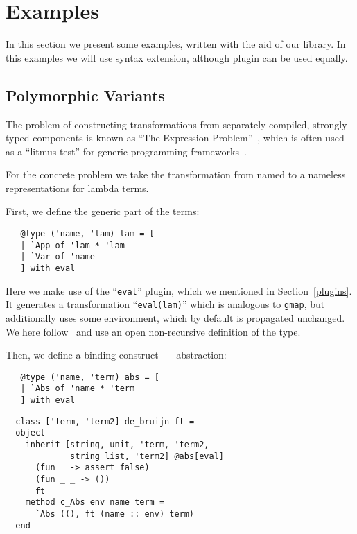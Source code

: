 \section{Examples}

In this section we present some examples, written with the aid of our library. In this examples we will use  syntax extension,
although  plugin can be used equally.


\subsection{Polymorphic Variants}


The problem of
constructing transformations from separately compiled, strongly typed components is known as ``The Expression Problem''~\cite{ExpressionProblem}, which
is often used as a ``litmus test'' for generic programming frameworks~\cite{ObjectAlgebras,ALaCarte}.

For the concrete problem we take the transformation from named to a nameless representations for lambda terms.

First, we define the generic part of the terms:

\begin{lstlisting}
   @type ('name, 'lam) lam = [
   | `App of 'lam * 'lam
   | `Var of 'name
   ] with eval
\end{lstlisting}

Here we make use of the ``\lstinline{eval}'' plugin, which we mentioned in Section~\ref{plugins}. It generates a transformation ``\lstinline{eval(lam)}'' which is analogous
to \lstinline{gmap}, but additionally uses some environment, which by default is propagated unchanged. We here follow~\cite{PolyVarReuse} and use an open non-recursive definition
of the type.

Then, we define a binding construct~--- abstraction:

\begin{lstlisting}
   @type ('name, 'term) abs = [
   | `Abs of 'name * 'term
   ] with eval
\end{lstlisting}

\begin{lstlisting}
  class ['term, 'term2] de_bruijn ft =
  object
    inherit [string, unit, 'term, 'term2,
             string list, 'term2] @abs[eval]
      (fun _ -> assert false)
      (fun _ _ -> ())
      ft
    method c_Abs env name term =
      `Abs ((), ft (name :: env) term)
  end
\end{lstlisting}

